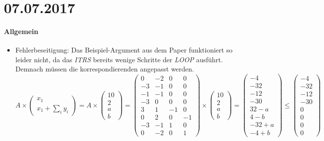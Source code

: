 \section*{07.07.2017}

\paragraph{Allgemein}
\begin{itemize}
	\item Fehlerbeseitigung: \newline
		Das Beispiel-Argument aus dem Paper funktioniert so leider nicht, da das \emph{ITRS} bereits wenige Schritte der \emph{LOOP} ausführt.\newline
		Demnach müssen die korrespondierenden  angepasst werden. 
		$ A \times \begin{pmatrix} x_1 \\ x_1 + \sum_{i}y_i \end{pmatrix} = A \times \begin{pmatrix} 10 \\ 2 \\ a \\ b \end{pmatrix} =
		\begin{pmatrix}
			0 & -2 & 0 & 0 \\
			-3 & -1 & 0 & 0 \\
			-1 & -1 & 0 & 0 \\
			-3 & 0 & 0 & 0 \\
			3 & 1 & -1 & 0 \\
			0 & 2 & 0 & -1 \\
			-3 & -1 & 1 & 0 \\
			0 & -2 & 0 & 1
		\end{pmatrix} \times  \begin{pmatrix} 10 \\ 2 \\ a \\ b \end{pmatrix} =  \begin{pmatrix} -4 \\ -32 \\ -12 \\ -30 \\ 32-a \\ 4-b \\ -32+a \\ -4+b \end{pmatrix} \le  \begin{pmatrix} -4 \\ -32 \\ -12 \\ -30 \\ 0 \\ 0 \\ 0 \\ 0 \end{pmatrix}$

\end{itemize}
